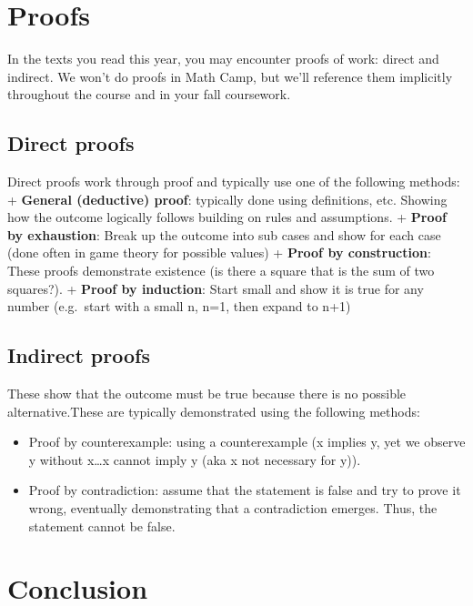 \documentclass[
]{book}
\providecommand{\tightlist}{%
  \setlength{\itemsep}{0pt}\setlength{\parskip}{0pt}}
\begin{document}
\hypertarget{proofs}{%
\section{Proofs}\label{proofs}}

In the texts you read this year, you may encounter proofs of work: direct and indirect. We won't do proofs in Math Camp, but we'll reference them implicitly throughout the course and in your fall coursework.

\hypertarget{direct-proofs}{%
\subsection{Direct proofs}\label{direct-proofs}}

Direct proofs work through proof and typically use one of the following methods:
+ \textbf{General (deductive) proof}: typically done using definitions, etc. Showing how the outcome logically follows building on rules and assumptions.
+ \textbf{Proof by exhaustion}: Break up the outcome into sub cases and show for each case (done often in game theory for possible values)
+ \textbf{Proof by construction}: These proofs demonstrate existence (is there a square that is the sum of two squares?).
+ \textbf{Proof by induction}: Start small and show it is true for any number (e.g.~start with a small n, n=1, then expand to n+1)

\hypertarget{indirect-proofs}{%
\subsection{Indirect proofs}\label{indirect-proofs}}

These show that the outcome must be true because there is no possible alternative.These are typically demonstrated using the following methods:

\begin{itemize}
\tightlist
\item
  Proof by counterexample: using a counterexample (x implies y, yet we observe y without x\ldots x cannot imply y (aka x not necessary for y)).
\item
  Proof by contradiction: assume that the statement is false and try to prove it wrong, eventually demonstrating that a contradiction emerges. Thus, the statement cannot be false.
\end{itemize}

\hypertarget{conclusion}{%
\section{Conclusion}\label{conclusion}}
\end{document}
